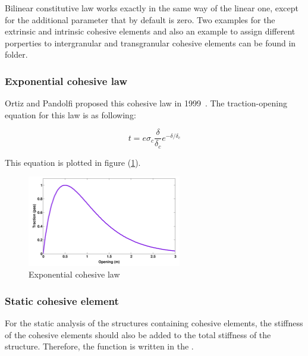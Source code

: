Bilinear constitutive law works exactly in the same way of the linear
one, except for the additional parameter  that by
default is zero. Two examples for the extrinsic and intrinsic cohesive
elements and also an example to assign different porperties to
intergranular and transgranular cohesive elements can be found in
 folder.

\subsubsection{Exponential cohesive law}

Ortiz and Pandolfi proposed this cohesive law in 1999~\cite{ortiz1999}.  The
traction-opening equation for this law is as following:

\begin{equation}
  \label{eq:exponential_law}
  t = e \sigma_c \frac{\delta}{\delta_c}e^{-\delta/ \delta_c}
\end{equation}


This equation is plotted in figure (\ref{fig:smm:CL:ECL}).

 \begin{figure}[!htb]
    \begin{center}
      \includegraphics[width=0.6\textwidth,keepaspectratio=true]{figures/cohesive_exponential.pdf}
      \caption{Exponential cohesive law}
      \label{fig:smm:CL:ECL}
    \end{center}
  \end{figure}



\subsubsection{Static cohesive element}

For  the  static  analysis   of  the  structures  containing  cohesive
elements, the stiffness of the cohesive elements should also be added to the
total      stiffness       of      the      structure.      Therefore,
the  function    is written  in  the
.

